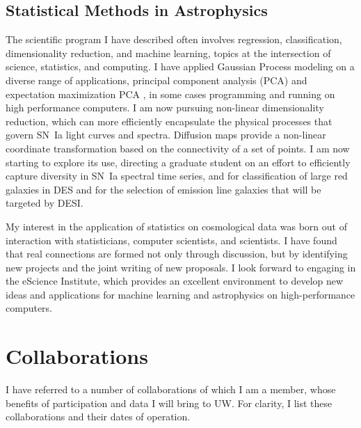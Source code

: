 \documentclass{article}
\begin{document}
\subsection{Statistical Methods in Astrophysics}
The scientific program I have described often involves regression, classification, dimensionality reduction,
and machine learning, topics at the intersection of science, statistics, and computing.  I have applied Gaussian Process modeling
on a diverse range of applications, principal component
analysis (PCA) and expectation maximization PCA \cite{2012PhRvD..85l3530S,2013ApJ...766...84K,
2013PhRvD..87l3512H}, in some cases programming and running on high performance computers.
I am now pursuing non-linear dimensionality reduction, which can more efficiently encapsulate
the physical processes that govern SN~Ia light curves and spectra.
Diffusion maps provide a non-linear coordinate transformation based on the connectivity of a set of points.
I am now starting to explore its use, directing a graduate student on an effort
to efficiently capture diversity in SN~Ia spectral time series, and for classification of large red galaxies in DES
and for the selection of emission line galaxies that will be targeted by DESI.

My interest in the application of statistics on cosmological data
was born out of interaction with statisticians, computer scientists,
and scientists. I have found that real connections are formed not only through discussion,
but by identifying new projects and the joint writing of new proposals.
I look forward to engaging in
the eScience Institute, which provides an excellent environment to develop new ideas and applications
for machine learning and astrophysics on high-performance computers.


\section{Collaborations}
I have referred to a number of collaborations of which I am a member, whose benefits of participation
and data  I will bring to UW.  For clarity, I list these collaborations and their dates of operation.
\end{document}
